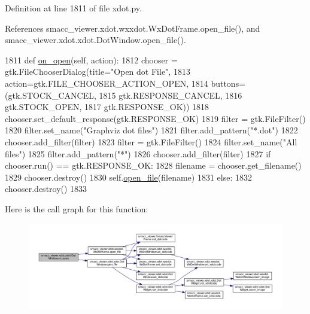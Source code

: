 Definition at line 1811 of file xdot.\+py.



References smacc\+\_\+viewer.\+xdot.\+wxxdot.\+Wx\+Dot\+Frame.\+open\+\_\+file(), and smacc\+\_\+viewer.\+xdot.\+xdot.\+Dot\+Window.\+open\+\_\+file().


\begin{DoxyCode}
1811     \textcolor{keyword}{def }\hyperlink{classsmacc__viewer_1_1xdot_1_1xdot_1_1DotWindow_aa46fccb243521df058e249dfa42f544c}{on\_open}(self, action):
1812         chooser = gtk.FileChooserDialog(title=\textcolor{stringliteral}{"Open dot File"},
1813                                         action=gtk.FILE\_CHOOSER\_ACTION\_OPEN,
1814                                         buttons=(gtk.STOCK\_CANCEL,
1815                                                  gtk.RESPONSE\_CANCEL,
1816                                                  gtk.STOCK\_OPEN,
1817                                                  gtk.RESPONSE\_OK))
1818         chooser.set\_default\_response(gtk.RESPONSE\_OK)
1819         filter = gtk.FileFilter()
1820         filter.set\_name(\textcolor{stringliteral}{"Graphviz dot files"})
1821         filter.add\_pattern(\textcolor{stringliteral}{"*.dot"})
1822         chooser.add\_filter(filter)
1823         filter = gtk.FileFilter()
1824         filter.set\_name(\textcolor{stringliteral}{"All files"})
1825         filter.add\_pattern(\textcolor{stringliteral}{"*"})
1826         chooser.add\_filter(filter)
1827         \textcolor{keywordflow}{if} chooser.run() == gtk.RESPONSE\_OK:
1828             filename = chooser.get\_filename()
1829             chooser.destroy()
1830             self.\hyperlink{classsmacc__viewer_1_1xdot_1_1xdot_1_1DotWindow_a1fd99c9d7a38dff168054383a435f00a}{open\_file}(filename)
1831         \textcolor{keywordflow}{else}:
1832             chooser.destroy()
1833 
\end{DoxyCode}


Here is the call graph for this function\+:
\nopagebreak
\begin{figure}[H]
\begin{center}
\leavevmode
\includegraphics[width=350pt]{classsmacc__viewer_1_1xdot_1_1xdot_1_1DotWindow_aa46fccb243521df058e249dfa42f544c_cgraph}
\end{center}
\end{figure}


